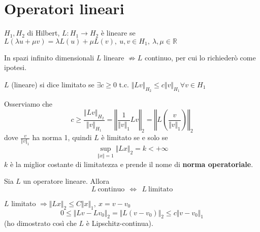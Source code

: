 \documentclass[10pt,a4paper,twoside,openright]{book}
\begin{document}
\section{Operatori lineari}
\begin{definition}
	 $\displaystyle H_{1},H_{2}$ di Hilbert, $\displaystyle L:H_{1}\rightarrow H_{2}$ è lineare se $\displaystyle L(\lambda u+\mu v) =\lambda L(u) +\mu L(v),\ u,v\in H_{1},\ \lambda,\mu \in \mathbb{R}$
\end{definition}
\begin{nb}
	In spazi infinito dimensionali $\displaystyle L$ lineare $\displaystyle \nRightarrow $$\displaystyle L$ continuo, per cui lo richiederò come ipotesi.
\end{nb}
\begin{definition}
	 $\displaystyle L$ (lineare) si dice limitato se $\displaystyle \exists c\geqslant 0$ t.c. $\displaystyle \Vert Lv\Vert _{H_{2}} \leqslant c\Vert v\Vert _{H_{1}} \forall v\in H_{1}$
\end{definition}
Osserviamo che 
\begin{equation*}
	c\geqslant \frac{\Vert Lv\Vert _{H_{2}}}{\Vert v\Vert _{H_{1}}} =\left\Vert \frac{1}{\Vert v\Vert _{1}} Lv\right\Vert _{2} =\left\Vert L\left(\frac{v}{\Vert v\Vert _{1}}\right)\right\Vert _{2}
\end{equation*}
dove $\displaystyle \frac{v}{\Vert v\Vert _{1}}$ ha norma 1, quindi $\displaystyle L$ è limitato se e solo se
\begin{equation*}
	\sup _{\Vert x\Vert =1}\Vert Lx\Vert _{2} =k< +\infty 
\end{equation*}
$\displaystyle k$ è la miglior costante di limitatezza e prende il nome di \textbf{norma operatoriale}.
\begin{theorem}
	Sia $\displaystyle L$ un operatore lineare. Allora
	\begin{equation}
		L\ \text{continuo} \ \ \Leftrightarrow \ \ L\ \text{limitato}
		\label{eq:continuo-limitato}
	\end{equation}
\end{theorem}
\begin{dimostrazione}
	$\displaystyle L$ limitato $\displaystyle \Rightarrow \Vert Lx\Vert _{2} \leqslant C\Vert x\Vert _{1},\ x=v-v_{0}$
	\begin{equation*}
		0\leqslant \Vert Lv-Lv_{0}\Vert _{2} =\Vert L(v-v_{0})\Vert _{2} \leqslant c\Vert v-v_{0}\Vert _{1}
	\end{equation*}
	(ho dimostrato così che $\displaystyle L$ è Lipschitz-continua).
\end{dimostrazione}
\end{document}
